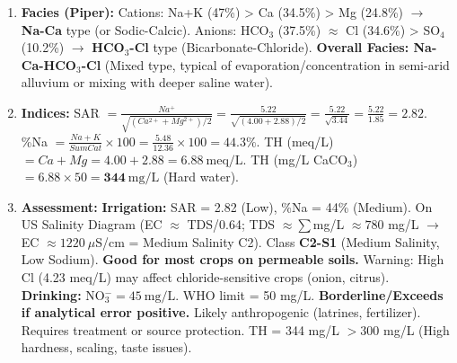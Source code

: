 \documentclass[11pt]{article}
\begin{document}
\begin{exoresolu}
\begin{enumerate}
    \item \textbf{Facies (Piper):}
    Cations: Na+K (47\%) > Ca (34.5\%) > Mg (24.8\%) $\to$ \textbf{Na-Ca} type (or Sodic-Calcic).
    Anions: HCO$_3$ (37.5\%) $\approx$ Cl (34.6\%) > SO$_4$ (10.2\%) $\to$ \textbf{HCO$_3$-Cl} type (Bicarbonate-Chloride).
    \textbf{Overall Facies: Na-Ca-HCO$_3$-Cl} (Mixed type, typical of evaporation/concentration in semi-arid alluvium or mixing with deeper saline water).
    \item \textbf{Indices:}
    SAR $= \frac{Na^+}{\sqrt{(Ca^{2+}+Mg^{2+})/2}} = \frac{5.22}{\sqrt{(4.00+2.88)/2}} = \frac{5.22}{\sqrt{3.44}} = \frac{5.22}{1.85} = \mathbf{2.82}$.
    \%Na $= \frac{Na+K}{Sum Cat} \times 100 = \frac{5.48}{12.36} \times 100 = \mathbf{44.3\%}$.
    TH (meq/L) $= Ca + Mg = 4.00 + 2.88 = 6.88\ \mathrm{meq/L}$.
    TH (mg/L CaCO$_3$) $= 6.88 \times 50 = \mathbf{344\ \mathrm{mg/L}}$ (Hard water).
    \item \textbf{Assessment:}
    \textbf{Irrigation:} SAR = 2.82 (Low), \%Na = 44\% (Medium). On US Salinity Diagram (EC $\approx$ TDS/0.64; TDS $\approx \sum$mg/L $\approx 780$ mg/L $\to$ EC $\approx 1220\ \mu$S/cm = Medium Salinity C2). Class \textbf{C2-S1} (Medium Salinity, Low Sodium). \textbf{Good for most crops on permeable soils.} Warning: High Cl (4.23 meq/L) may affect chloride-sensitive crops (onion, citrus).
    \textbf{Drinking:} NO$_3^- = 45\ \mathrm{mg/L}$. WHO limit = 50 mg/L. \textbf{Borderline/Exceeds if analytical error positive.} Likely anthropogenic (latrines, fertilizer). Requires treatment or source protection. TH = 344 mg/L $> 300$ mg/L (High hardness, scaling, taste issues).
\end{enumerate}
\end{exoresolu}
\end{document}
